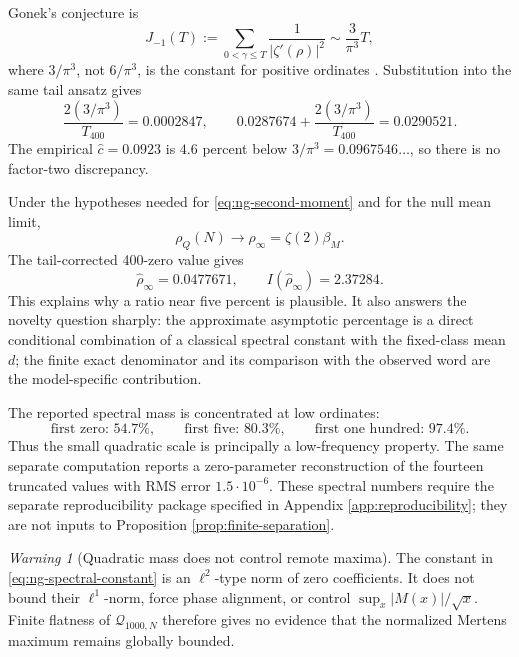 \documentclass[11pt,reqno]{amsart}
\numberwithin{equation}{section}
\theoremstyle{plain}
\theoremstyle{definition}
\theoremstyle{remark}
\newtheorem{warning}[theorem]{Warning}
\newcommand{\QF}{\mathcal Q}
\begin{document}
Gonek's conjecture is
\begin{equation}
J_{-1}(T)
:=\sum_{0<\gamma\leq T}\frac1{|\zeta'(\rho)|^2}
\sim\frac{3}{\pi^3}T,
\label{eq:gonek-conjecture}
\end{equation}
where \(3/\pi^3\), not \(6/\pi^3\), is the constant for positive ordinates
\cite{Gonek1989,Ng2004}.  Substitution into the same tail ansatz gives
\begin{equation}
\frac{2(3/\pi^3)}{T_{400}}=0.0002847,\qquad
0.0287674+\frac{2(3/\pi^3)}{T_{400}}=0.0290521.
\label{eq:gonek-tail-comparison}
\end{equation}
The empirical \(\widehat c=0.0923\) is \(4.6\) percent below
\(3/\pi^3=0.0967546\ldots\), so there is no factor-two discrepancy.

Under the hypotheses needed for \eqref{eq:ng-second-moment} and for the null
mean limit,
\begin{equation}
\rho_Q(N)\longrightarrow
\rho_{\infty}=\zeta(2)\beta_M.
\label{eq:conditional-ratio-limit}
\end{equation}
The tail-corrected 400-zero value gives
\begin{equation}
\widehat\rho_{\infty}=0.0477671,\qquad
I(\widehat\rho_{\infty})=2.37284.
\label{eq:conditional-spectral-ratio}
\end{equation}
This explains why a ratio near five percent is plausible.  It also answers
the novelty question sharply: the approximate asymptotic percentage is a
direct conditional combination of a classical spectral constant with the
fixed-class mean \(d\); the finite exact denominator and its comparison with
the observed word are the model-specific contribution.

The reported spectral mass is concentrated at low ordinates:
\begin{equation}
\text{first zero: }54.7\%,\qquad
\text{first five: }80.3\%,\qquad
\text{first one hundred: }97.4\%.
\label{eq:low-zero-concentration}
\end{equation}
Thus the small quadratic scale is principally a low-frequency property.
The same separate computation reports a zero-parameter reconstruction of the
fourteen truncated values with RMS error \(1.5\cdot10^{-6}\).  These spectral
numbers require the separate reproducibility package specified in Appendix
\ref{app:reproducibility}; they are not inputs to Proposition
\ref{prop:finite-separation}.

\begin{warning}[Quadratic mass does not control remote maxima]
\label{warn:quadratic-mass-not-maximum}
The constant in \eqref{eq:ng-spectral-constant} is an \(\ell^2\)-type norm of
zero coefficients.  It does not bound their \(\ell^1\)-norm, force phase
alignment, or control \(\sup_x|M(x)|/\sqrt x\).  Finite flatness of
\(\QF_{1000,N}\) therefore gives no evidence that the normalized Mertens
maximum remains globally bounded.
\end{warning}
\end{document}
